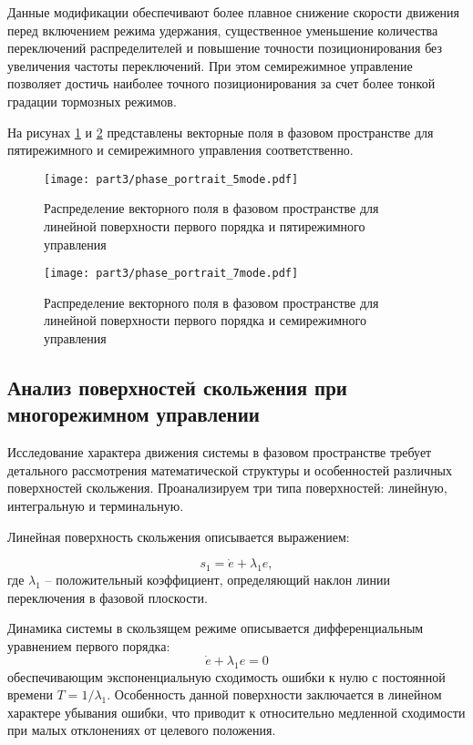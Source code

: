 Данные модификации обеспечивают более плавное снижение скорости движения перед включением режима удержания,
существенное уменьшение количества переключений распределителей и повышение точности позиционирования
без увеличения частоты переключений. При этом семирежимное управление позволяет достичь
наиболее точного позиционирования за счет более тонкой градации тормозных режимов.

На рисунах \ref{fig:vector_field_linear_5mode} и \ref{fig:vector_field_linear_7mode} представлены векторные поля
в фазовом пространстве для пятирежимного и семирежимного управления соответственно.

\begin{figure}[htbp]
	\centering
	\texttt{[image: part3/phase\_portrait\_5mode.pdf]}
	\caption{Распределение векторного поля в фазовом пространстве для линейной поверхности первого порядка и пятирежимного управления}
	\label{fig:vector_field_linear_5mode}
\end{figure}

\begin{figure}[htbp]
	\centering
	\texttt{[image: part3/phase\_portrait\_7mode.pdf]}
	\caption{Распределение векторного поля в фазовом пространстве для линейной поверхности первого порядка и семирежимного управления}
	\label{fig:vector_field_linear_7mode}
\end{figure}

\subsection{Анализ поверхностей скольжения при многорежимном управлении}\label{subsec:ch3/sec3/sub3}

Исследование характера движения системы в фазовом пространстве требует детального рассмотрения математической
структуры и особенностей различных поверхностей скольжения.
Проанализируем три типа поверхностей: линейную, интегральную и терминальную.

Линейная поверхность скольжения описывается выражением:

$$
	s_1 = \dot{e} + \lambda_1 e,
$$
где $\lambda_1$ -- положительный коэффициент, определяющий наклон линии переключения в
фазовой плоскости.

Динамика системы в скользящем режиме описывается дифференциальным уравнением первого порядка:
$$
	\dot{e} + \lambda_1 e = 0
$$
обеспечивающим экспоненциальную сходимость ошибки к нулю с постоянной
времени $T = 1/\lambda_1$. Особенность данной поверхности заключается в
линейном характере убывания ошибки, что приводит к
относительно медленной сходимости при малых отклонениях от целевого положения.

